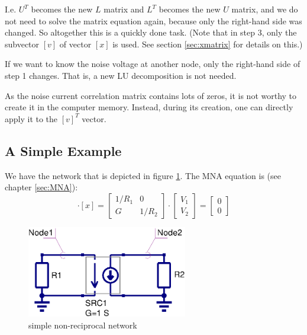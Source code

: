 I.e. $U^T$ becomes the new $L$ matrix and $L^T$ becomes the new $U$
matrix, and we do not need to solve the matrix equation again, because
only the right-hand side was changed.  So altogether this is a quickly
done task.  (Note that in step 3, only the subvector $[v]$ of vector
$[x]$ is used.  See section \ref{sec:xmatrix} for details on this.)

\addvspace{12pt}

If we want to know the noise voltage at another node, only the
right-hand side of step 1 changes.  That is, a new LU decomposition is
not needed.

\addvspace{12pt}

As the noise current correlation matrix contains lots of zeros, it is
not worthy to create it in the computer memory.  Instead, during its
creation, one can directly apply it to the $\left[v\right]^T$ vector.

\subsection{A Simple Example}

We have the network that is depicted in figure \ref{fig:mna_noise1}.
The MNA equation is (see chapter \ref{sec:MNA}):
\begin{equation}
[A]\cdot [x] =
\begin{bmatrix}
1/R_1 & 0\\
  G   & 1/R_2
\end{bmatrix}
\cdot
\begin{bmatrix}
V_1\\
V_2
\end{bmatrix}
=
\begin{bmatrix}
0\\
0
\end{bmatrix}
\end{equation}

\begin{figure}[ht]
\begin{center}
\includegraphics[width=7cm]{MNAnoise1}
\end{center}
\caption{simple non-reciprocal network}
\label{fig:mna_noise1}
\end{figure}
\FloatBarrier

